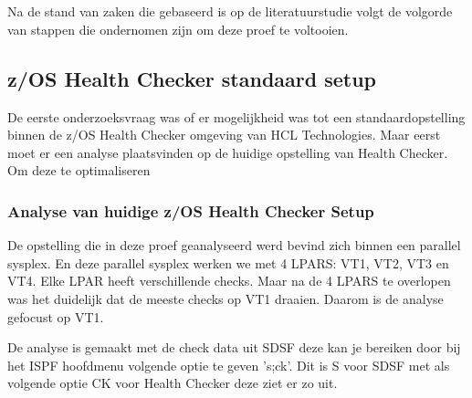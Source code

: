
\chapter{}
\label{ch:methodologie}




Na de stand van zaken die gebaseerd is op de literatuurstudie volgt de volgorde van stappen die ondernomen zijn om deze proef te voltooien. 

\section{z/OS Health Checker standaard setup}
\label{sec:z/OS Health Checker Standaard setup}

De eerste onderzoeksvraag was of er mogelijkheid was tot een standaardopstelling binnen de z/OS Health Checker omgeving van HCL Technologies. Maar eerst moet er een analyse plaatsvinden op de huidige opstelling van Health Checker. Om deze te optimaliseren

\subsection{Analyse van huidige z/OS Health Checker Setup}
\label{subsec:Analyse van huidige z/OS Health Checker Setup}
De opstelling die in deze proef geanalyseerd werd bevind zich binnen een parallel sysplex. En deze parallel sysplex werken we met 4 LPARS: VT1, VT2, VT3 en VT4. Elke LPAR heeft verschillende checks. Maar na de 4 LPARS te overlopen was het duidelijk dat de meeste checks op VT1 draaien. Daarom is de analyse gefocust op VT1.

De analyse is gemaakt met de check data uit SDSF deze kan je bereiken door bij het ISPF hoofdmenu volgende optie te geven 's;ck'. Dit is S voor SDSF met als volgende optie CK voor Health Checker deze ziet er zo uit.


